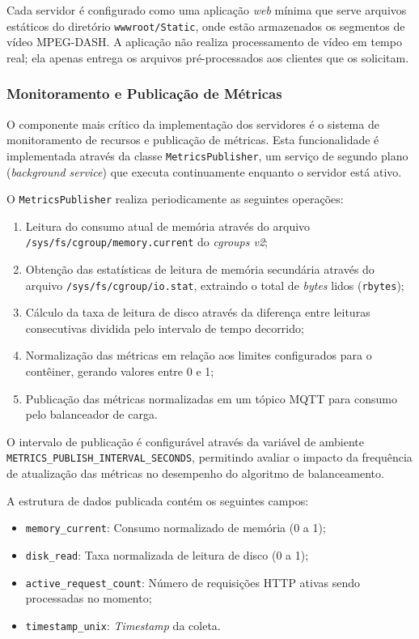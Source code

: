 Cada servidor é configurado como uma aplicação \textit{web} mínima que serve arquivos estáticos do diretório \texttt{wwwroot/Static}, onde estão armazenados os segmentos de vídeo MPEG-DASH. A aplicação não realiza processamento de vídeo em tempo real; ela apenas entrega os arquivos pré-processados aos clientes que os solicitam.

\subsubsection{Monitoramento e Publicação de Métricas}

O componente mais crítico da implementação dos servidores é o sistema de monitoramento de recursos e publicação de métricas. Esta funcionalidade é implementada através da classe \texttt{MetricsPublisher}, um serviço de segundo plano (\textit{background service}) que executa continuamente enquanto o servidor está ativo.

O \texttt{MetricsPublisher} realiza periodicamente as seguintes operações:

\begin{enumerate}
    \item Leitura do consumo atual de memória através do arquivo \texttt{/sys/fs/cgroup/\allowbreak memory.current} do \textit{cgroups v2};
    \item Obtenção das estatísticas de leitura de memória secundária através do arquivo \texttt{/sys/fs/\allowbreak cgroup/io.stat}, extraindo o total de \textit{bytes} lidos (\texttt{rbytes});
    \item Cálculo da taxa de leitura de disco através da diferença entre leituras consecutivas dividida pelo intervalo de tempo decorrido;
    \item Normalização das métricas em relação aos limites configurados para o contêiner, gerando valores entre 0 e 1;
    \item Publicação das métricas normalizadas em um tópico MQTT para consumo pelo balanceador de carga.
\end{enumerate}

O intervalo de publicação é configurável através da variável de ambiente \texttt{METRICS\_PUBLISH\_\allowbreak INTERVAL\_SECONDS}, permitindo avaliar o impacto da frequência de atualização das métricas no desempenho do algoritmo de balanceamento.

A estrutura de dados publicada contém os seguintes campos:

\begin{itemize}
    \item \texttt{memory\_current}: Consumo normalizado de memória (0 a 1);
    \item \texttt{disk\_read}: Taxa normalizada de leitura de disco (0 a 1);
    \item \texttt{active\_request\_count}: Número de requisições HTTP ativas sendo processadas no momento;
    \item \texttt{timestamp\_unix}: \textit{Timestamp} da coleta.
\end{itemize}

